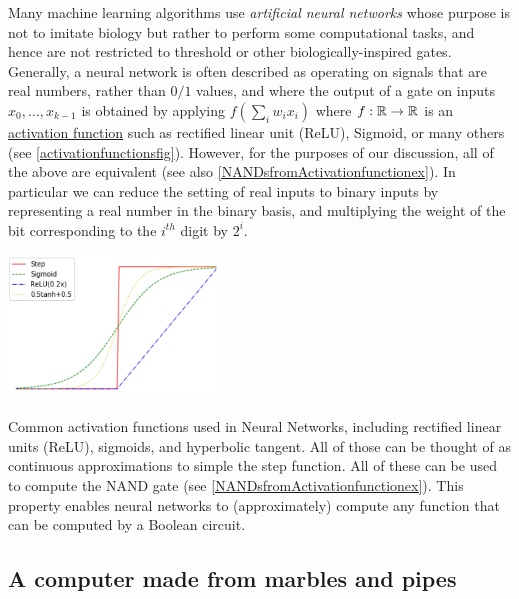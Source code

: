 Many machine learning algorithms use \emph{artificial neural networks}
whose purpose is not to imitate biology but rather to perform some
computational tasks, and hence are not restricted to threshold or other
biologically-inspired gates. Generally, a neural network is often
described as operating on signals that are real numbers, rather than
\(0/1\) values, and where the output of a gate on inputs
\(x_0,\ldots,x_{k-1}\) is obtained by applying \(f(\sum_i w_i x_i)\)
where \(f:{\mathbb{R}} \rightarrow {\mathbb{R}}\) is an
\href{https://goo.gl/p9izfA}{activation function} such as rectified
linear unit (ReLU), Sigmoid, or many others (see
\cref{activationfunctionsfig}). However, for the purposes of our
discussion, all of the above are equivalent (see also
\cref{NANDsfromActivationfunctionex}). In particular we can reduce the
setting of real inputs to binary inputs by representing a real number in
the binary basis, and multiplying the weight of the bit corresponding to
the \(i^{th}\) digit by \(2^i\).


\begin{marginfigure}
\centering
\includegraphics[width=\linewidth, height=1.5in, keepaspectratio]{../figure/activationfuncs.png}
\caption{Common activation functions used in Neural Networks, including
rectified linear units (ReLU), sigmoids, and hyperbolic tangent. All of
those can be thought of as continuous approximations to simple the step
function. All of these can be used to compute the NAND gate (see
\cref{NANDsfromActivationfunctionex}). This property enables neural
networks to (approximately) compute any function that can be computed by
a Boolean circuit.}
\label{activationfunctionsfig}
\end{marginfigure}

\subsection{A computer made from marbles and
pipes}\label{A-computer-made-from-marb}

